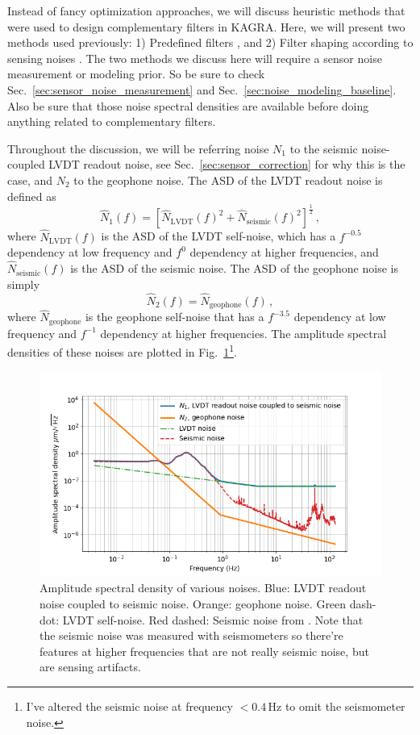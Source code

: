 Instead of fancy optimization approaches, we will discuss heuristic methods that were used to design complementary filters in KAGRA.
Here, we will present two methods used previously: 1) Predefined filters \cite{Sekiguchi:2016bmv, Heijningen:2018evm}, and 2) Filter shaping according to sensing noises \cite{low_frequency_optimization_and_performance_of_advanced_virgo_seismic_isolation_system}.
The two methods we discuss here will require a sensor noise measurement or modeling prior.
So be sure to check Sec.~\ref{sec:sensor_noise_measurement} and Sec.~\ref{sec:noise_modeling_baseline}.
Also be sure that those noise spectral densities are available before doing anything related to complementary filters.

Throughout the discussion, we will be referring noise $N_1$ to the seismic noise-coupled LVDT readout noise, see Sec.~\ref{sec:sensor_correction} for why this is the case, and $N_2$ to the geophone noise.
The ASD of the LVDT readout noise is defined as
\begin{equation}
	\hat{N}_1(f) = \left[ \hat{N}_\mathrm{LVDT}(f)^2 + \hat{N}_\mathrm{seismic}(f)^2 \right]^\frac{1}{2}\,,
\end{equation}
where $\hat{N}_\mathrm{LVDT}(f)$ is the ASD of the LVDT self-noise, which has a $f^{-0.5}$ dependency at low frequency and $f^{0}$ dependency at higher frequencies, and $\hat{N}_\mathrm{seismic}(f)$ is the ASD of the seismic noise.
The ASD of the geophone noise is simply
\begin{equation}
	\hat{N}_2(f) = \hat{N}_\mathrm{geophone}(f)\,,
\end{equation}
where $\hat{N}_\mathrm{geophone}$ is the geophone self-noise that has a $f^{-3.5}$ dependency at low frequency and $f^{-1}$ dependency at higher frequencies.
The amplitude spectral densities of these noises are plotted in Fig.~\ref{fig:sensornoisesforcomplementaryfilter}\footnote{I've altered the seismic noise at frequency $<0.4\,\mathrm{Hz}$ to omit the seismometer noise.}.
\begin{figure}[!h]
	\centering
	\includegraphics[width=0.7\linewidth]{figures/sensor_noises_for_complementary_filter}
	\caption{Amplitude spectral density of various noises. Blue: LVDT readout noise coupled to seismic noise. Orange: geophone noise. Green dash-dot: LVDT self-noise. Red dashed: Seismic noise from \cite{seismic_noise_kagra}. Note that the seismic noise was measured with seismometers so there're features at higher frequencies that are not really seismic noise, but are sensing artifacts. }
	\label{fig:sensornoisesforcomplementaryfilter}
\end{figure}

